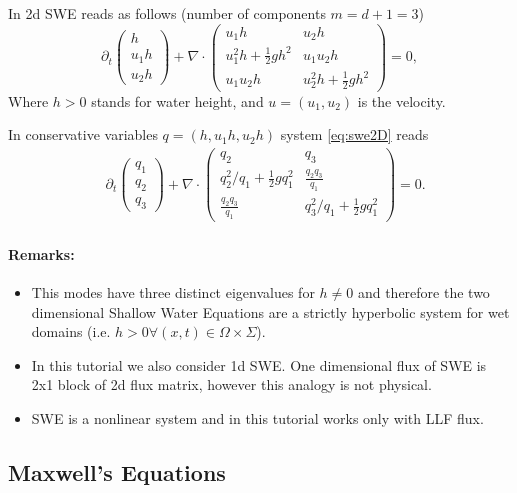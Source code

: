 \documentclass[a4paper,12pt]{article}
\theoremstyle{definition}
\theoremstyle{definition}
\newcommand{\Dim}{d}
\begin{document}
In 2d SWE reads as follows (number of components $m=\Dim+1=3$)
\begin{equation}\label{eq:swe2D}
\partial_t \begin{pmatrix}
h\\
u_1h\\
u_2h
\end{pmatrix}+ \nabla\cdot
\left( \begin{matrix}
u_1h   & u_2h\\
u_1^2h + \frac{1}{2}gh^2 & u_1u_2h\\
u_1u_2h & u_2^2h + \frac{1}{2}gh^2
\end{matrix}\right) = 0,
\end{equation}
Where $h>0$ stands for water height, and $u=(u_1,u_2)$ is the velocity.

In conservative variables $q = (h, u_1h,u_2h)$ system \eqref{eq:swe2D} reads
\begin{align} 
&\partial_t\begin{pmatrix}
q_1\\
q_2\\
q_3
\end{pmatrix} + 
\nabla \cdot \left( \begin{matrix}
q_2 & q_3\\
q_2^2/q_1 + \frac{1}{2}gq_1^2 & \frac{q_2q_3}{q_1}\\
\frac{q_2q_3}{q_1} & q_3^2/q_1 + \frac{1}{2}gq_1^2
\end{matrix} \right) = 0.
\end{align}

\paragraph{Remarks:}
\begin{itemize}
	\item This modes have three distinct eigenvalues for $h\neq 0$ and therefore the two dimensional Shallow Water Equations are a strictly hyperbolic system for wet domains (i.e. $h>0 \forall (x,t) \in \Omega\times\Sigma$).
	\item In this tutorial we also consider 1d SWE. One dimensional flux of SWE is 2x1 block of 2d flux matrix, however this analogy is not physical.
	\item SWE is a nonlinear system and in this tutorial works only with LLF flux.
\end{itemize}



\subsection{Maxwell's Equations}
\end{document}

